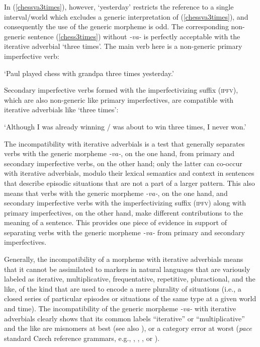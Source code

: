 \documentclass[output=paper,colorlinks,citecolor=brown]{langscibook}
\begin{document}
\noindent In (\ref{chessva3times}), however, `yesterday'
restricts the reference to a single interval/world which excludes a generic interpretation of (\ref{chessva3times}), and consequently the use
of the generic morpheme is odd.
The corresponding non-generic sentence (\ref{chess3times})  without \textit{-va-} is perfectly acceptable with the iterative adverbial `three times'.
The main verb here is a non-generic primary imperfective verb:

\glt `Paul played  chess with grandpa three times yesterday.'
\z

\noindent Secondary imperfective verbs formed with
the imperfectivizing suffix (\textsc{ipfv}),
which are also non-generic like primary imperfectives,
are compatible with iterative adverbials like `three times':

\glt `Although I was already winning / was about to win three times, I never won.'
\z

\noindent
The incompatibility with iterative adverbials is a test that generally separates verbs with the generic morpheme \textit{-va-}, on the one hand,
from primary and secondary imperfective verbs, on the other hand;
only the latter can co-occur with iterative adverbials, modulo their lexical semantics and context in sentences that describe episodic situations that are not a part of a larger pattern. This also means that verbs
with the  generic morpheme \textit{-va-}, on the one hand, and secondary imperfective verbs with the imperfectivizing suffix (\textsc{ipfv})
along with primary imperfectives, on the other hand, make different contributions to the meaning of a sentence. This provides one piece of evidence in support of separating verbs with the generic morpheme \textit{-va-} from primary and secondary imperfectives.

Generally, the incompatibility of a morpheme with iterative  adverbials  means that  it cannot be assimilated to markers in natural languages that  are variously labeled as iterative, multiplicative, frequentative, repetitive, pluractional, and the like, of the kind that are used to encode a mere plurality of situations
(i.e., a closed series of particular episodes or situations of the same type at a given world and time).
The incompatibility of the generic morpheme \textit{-va-} with iterative adverbials
clearly shows that its common labels ``iterative''  or  ``multiplicative'' and the like
are misnomers at best (see also \citealt{bily1986iterative}), or a category error at worst (\textit{pace} standard Czech reference grammars, e.g., \citealt{petr1986mluvnice}, \citealt{Kosek2014}, \citealt{lamprecht1986historicka}, \citealt{nuebler2017} or  \citealt{dahl1995}).
\end{document}
